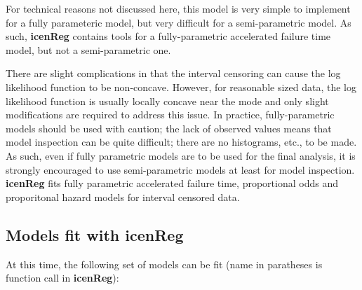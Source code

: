 \documentclass[a4paper]{article}
\begin{document}
For technical reasons not discussed here, this model is very simple to implement for a fully parameteric model, but very difficult for a semi-parametric model. As such, {\bf{icenReg}} contains tools for a fully-parametric accelerated failure time model, but not a semi-parametric one. 
  
  
There are slight complications in that the interval censoring can cause the log likelihood function to be non-concave. However, for reasonable sized data, the log likelihood function is usually locally concave near the mode and only slight modifications are required to address this issue. In practice, fully-parametric models should be used with caution; the lack of observed values means that model inspection can be quite difficult; there are no histograms, etc., to be made. As such, even if fully parametric models are to be used for the final analysis, it is strongly encouraged to use semi-parametric models at least for model inspection. {\bf icenReg} fits fully parametric accelerated failure time, proportional odds and  proporitonal hazard models for interval censored data. 
  
\subsection{Models fit with {\bf{icenReg}} }

At this time, the following set of models can be fit (name in paratheses is function call in {\bf{icenReg}}):
  
\end{document}
